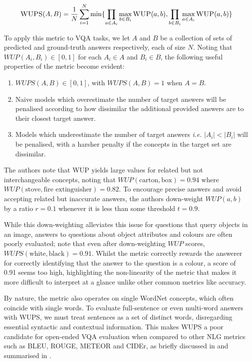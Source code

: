 \begin{equation}
    \textsc{WUPS}(A, B) = \frac{1}{N} \sum_{i=1}^N \min \{\prod_{a \in A_i} \max_{b \in B_i} \textsc{WUP}(a, b), \prod_{b \in B_i} \max_{a \in A_i} \textsc{WUP}(a, b)\}
    \label{equation:wups}
\end{equation}

To apply this metric to VQA tasks, we let \(A\) and \(B\) be a collection of sets of predicted and ground-truth answers respectively, each of size \(N\). Noting that \(WUP(A_i, B_i) \in [0, 1]\) for each \(A_i \in A\) and \(B_i \in B\), the following useful properties of the metric become evident:

\begin{enumerate}
    \item \(WUPS(A, B) \in [0, 1]\), with \(WUPS(A, B) = 1\) when \(A = B\).
    \item Naive models which overestimate the number of target answers will be penalised according to how dissimilar the additional provided answers are to their closest target answer.
    \item Models which underestimate the number of target answers \textit{i.e.} \(|A_i| < |B_i|\) will be penalised, with a harsher penalty if the concepts in the target set are dissimilar.
\end{enumerate}

The authors note that WUP yields large values for related but not interchangeable concepts, noting that \(WUP(\text{carton}, \text{box}) = 0.94\) where \(WUP(\text{stove}, \text{fire extinguisher}) = 0.82\). To encourage precise answers and avoid accepting related but inaccurate answers, the authors down-weight \(WUP(a, b)\) by a ratio \(r = 0.1\) whenever it is less than some threshold \(t = 0.9\).

While this down-weighting alleviates this issue for questions that query objects in an image, answers to questions about object attributes and colours are often poorly evaluated; \citeauthor{kafle2017visual} note that even after down-weighting \(WUP\) scores, \(WUPS(\text{white}, \text{black}) = 0.91\). Whilst the metric correctly rewards the answerer for correctly identifying that the answer to the question is a colour, a score of 0.91 seems too high, highlighting the non-linearity of the metric that makes it more difficult to interpret at a glance unlike other common metrics like accuracy.

By nature, the metric also operates on single WordNet concepts, which often coincide with single words. To evaluate full-sentence or even multi-word answers with WUPS, we must treat sentences as a set of distinct words, disregarding essential syntactic and contextual information. This makes WUPS a poor candidate for open-ended VQA evaluation when compared to other NLG metrics such as BLEU, ROUGE, METEOR and CIDEr, as briefly discussed in \subsectionautorefname{ \ref{subsection:open_ended_vqa_metrics}} and summarised in \tableautorefname{ \ref{tab:vqa_metrics_comparison}}.

